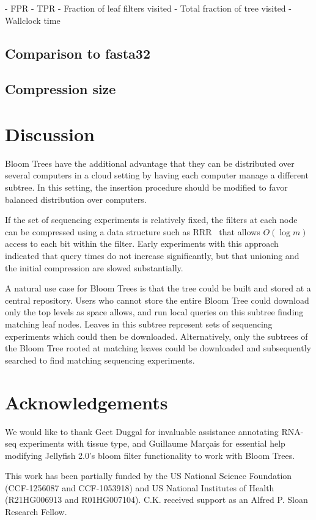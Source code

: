 \documentclass[11pt]{article}
\begin{document}
- FPR
- TPR
- Fraction of leaf filters visited 
- Total fraction of tree visited
- Wallclock time

\subsection{Comparison to fasta32}

\subsection{Compression size}

\section{Discussion}

Bloom Trees have the additional advantage that they can be distributed over several computers in a cloud setting by having each computer manage a different subtree. In this setting, the insertion procedure should be modified to favor balanced distribution over computers.

If the set of sequencing experiments is relatively fixed, the filters at each node can be compressed using a data structure such as RRR~\cite{rrr} that allows $O(\log m)$ access to each bit within the filter. Early experiments with this approach indicated that query times do not increase significantly, but that unioning and the initial compression are slowed substantially.

A natural use case for Bloom Trees is that the tree could be built and stored at a central repository. Users who cannot store the entire Bloom Tree could download only the top levels as space allows, and run local queries on this subtree finding matching leaf nodes. Leaves in this subtree represent sets of sequencing experiments which could then be downloaded. Alternatively, only the subtrees of the Bloom Tree rooted at matching leaves could be downloaded and subsequently searched to find matching sequencing experiments.

\section*{Acknowledgements}

We would like to thank Geet Duggal for invaluable assistance annotating RNA-seq experiments with tissue type, and Guillaume Mar\c{c}ais for essential help modifying Jellyfish 2.0's bloom filter functionality to work with Bloom Trees. 

This work has been partially funded by the US National Science Foundation (CCF-1256087 and CCF-1053918) and US National Institutes of Health (R21HG006913 and R01HG007104). C.K. received support as an Alfred P. Sloan Research Fellow. 



\end{document}
